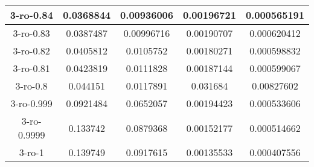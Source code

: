 \documentclass[12pt]{article}
\begin{document}
\begin{table}[h!]
\begin{tabular}{|c|c|c|c|c|}
3-ro-0.84 & 0.0368844   & 0.00936006   & 0.00196721   & 0.000565191  \\\hline
3-ro-0.83 & 0.0387487   & 0.00996716   & 0.00190707   & 0.000620412  \\\hline
3-ro-0.82 & 0.0405812   & 0.0105752   & 0.00180271   & 0.000598832  \\\hline
3-ro-0.81 & 0.0423819   & 0.0111828   & 0.00187144   & 0.000599067  \\\hline
3-ro-0.8 & 0.044151   & 0.0117891   & 0.031684   & 0.00827602  \\\hline
3-ro-0.999 & 0.0921484   & 0.0652057   & 0.00194423   & 0.000533606  \\\hline
3-ro-0.9999 & 0.133742   & 0.0879368   & 0.00152177   & 0.000514662  \\\hline
3-ro-1 & 0.139749   & 0.0917615   & 0.00135533   & 0.000407556  \\\hline
\end{tabular}
\end{table}
\end{document}
